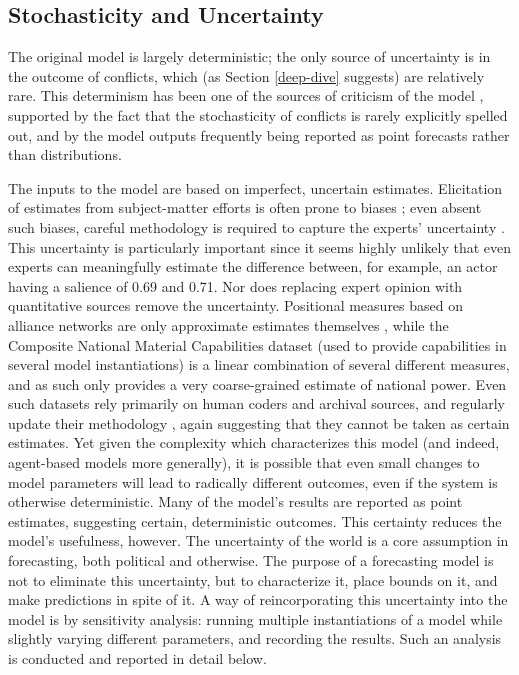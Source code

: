 \subsection{Stochasticity and Uncertainty}

The original model is largely deterministic; the only source of uncertainty is in the outcome of conflicts, which (as Section \ref{deep-dive} suggests) are relatively rare. This determinism has been one of the sources of criticism of the model \citep{brandt_2011}, supported by the fact that the stochasticity of conflicts is rarely explicitly spelled out, and by the model outputs frequently being reported as point forecasts rather than distributions. 

The inputs to the model are based on imperfect, uncertain estimates. Elicitation of estimates from subject-matter efforts is often prone to biases \citep{morgan_2014,tetlock_2005}; even absent such biases, careful methodology is required to capture the experts' uncertainty \citep{gill_2013}. This uncertainty is particularly important since it seems highly unlikely that even experts can meaningfully estimate the difference between, for example, an actor having a salience of 0.69 and 0.71. Nor does replacing expert opinion with quantitative sources remove the uncertainty. Positional measures based on alliance networks are only approximate estimates themselves \citep{signorino_1999b}, while the Composite National Material Capabilities dataset \citep{grieg_2010} (used to provide capabilities in several model instantiations) is a linear combination of several different measures, and as such only provides a very coarse-grained estimate of national power. Even such datasets rely primarily on human coders and archival sources, and regularly update their methodology \citep{gibler_2004}, again suggesting that they cannot be taken as certain estimates. Yet given the complexity which characterizes this model (and indeed, agent-based models more generally), it is possible that even small changes to model parameters will lead to radically different outcomes, even if the system is otherwise deterministic. Many of the model's results are reported as point estimates, suggesting certain, deterministic outcomes. This certainty reduces the model's usefulness, however. The uncertainty of the world is a core assumption in forecasting, both political and otherwise. The purpose of a forecasting model is not to eliminate this uncertainty, but to characterize it, place bounds on it, and make predictions in spite of it. A way of reincorporating this uncertainty into the model is by sensitivity analysis: running multiple instantiations of a model while slightly varying different parameters, and recording the results. Such an analysis is conducted and reported in detail below.



